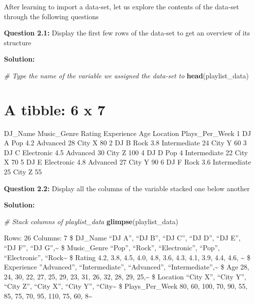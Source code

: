 \documentclass[
]{article}
\newenvironment{Shaded}{\begin{snugshade}}{\end{snugshade}}
\newcommand{\CommentTok}[1]{\textcolor[rgb]{0.56,0.35,0.01}{\textit{#1}}}
\newcommand{\FunctionTok}[1]{\textcolor[rgb]{0.13,0.29,0.53}{\textbf{#1}}}
\newcommand{\NormalTok}[1]{#1}
\begin{document}
After learning to import a data-set, let us explore the contents of the
data-set through the following questions

\textbf{Question 2.1:} Display the first few rows of the data-set to get
an overview of its structure

\textbf{Solution:}

\begin{Shaded}
\begin{Highlighting}[]
\CommentTok{\# Type the name of the variable we assigned the data{-}set to}
\FunctionTok{head}\NormalTok{(playlist\_data)}
\end{Highlighting}
\end{Shaded}

\hypertarget{a-tibble-6-x-7}{%
\section{A tibble: 6 x 7}\label{a-tibble-6-x-7}}

DJ\_Name Music\_Genre Rating Experience Age Location Plays\_Per\_Week 1
DJ A Pop 4.2 Advanced 28 City X 80 2 DJ B Rock 3.8 Intermediate 24 City
Y 60 3 DJ C Electronic 4.5 Advanced 30 City Z 100 4 DJ D Pop 4
Intermediate 22 City X 70 5 DJ E Electronic 4.8 Advanced 27 City Y 90 6
DJ F Rock 3.6 Intermediate 25 City Z 55

\textbf{Question 2.2:} Display all the columns of the variable stacked
one below another

\textbf{Solution:}

\begin{Shaded}
\begin{Highlighting}[]
\CommentTok{\# Stack columns of playlist\_data}
\FunctionTok{glimpse}\NormalTok{(playlist\_data)}
\end{Highlighting}
\end{Shaded}

Rows: 26 Columns: 7 \$ DJ\_Name ``DJ A'', ``DJ B'', ``DJ C'', ``DJ D'',
``DJ E'', ``DJ F'', ``DJ G'',\textasciitilde{} \$ Music\_Genre ``Pop'',
``Rock'', ``Electronic'', ``Pop'', ``Electronic'',
``Rock\textasciitilde{} \$ Rating 4.2, 3.8, 4.5, 4.0, 4.8, 3.6, 4.3,
4.1, 3.9, 4.4, 4.6, \textasciitilde{} \$ Experience ''Advanced'',
``Intermediate'', ``Advanced'', ``Intermediate'',\textasciitilde{} \$
Age 28, 24, 30, 22, 27, 25, 29, 23, 31, 26, 32, 28, 29,
25,\textasciitilde{} \$ Location ``City X'', ``City Y'', ``City Z'',
``City X'', ``City Y'', ``City\textasciitilde{} \$ Plays\_Per\_Week 80,
60, 100, 70, 90, 55, 85, 75, 70, 95, 110, 75, 60, 8\textasciitilde{}
\end{document}

